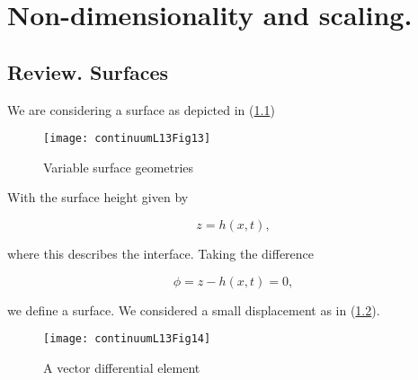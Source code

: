 %
%

\chapter{Non-dimensionality and scaling.}
\label{chap:continuumL14}
{}
\date{Mar 7, 2012}

\beginArtWithToc

%

\section{Review.  Surfaces}

We are considering a surface as depicted in (\ref{fig:continuumL14:continuumL14Fig13})

\begin{figure}[htp]
   \centering
   \texttt{[image: continuumL13Fig13]}
   \caption{Variable surface geometries}\label{fig:continuumL14:continuumL14Fig13}
\end{figure}

With the surface height given by

\begin{equation}\label{eqn:continuumL14:10}
z = h(x, t),
\end{equation}

where this describes the interface.  Taking the difference

\begin{equation}\label{eqn:continuumL14:30}
\phi = z - h(x, t) = 0,
\end{equation}

we define a surface.  We considered a small displacement as in (\ref{fig:continuumL14:continuumL14Fig14}).

\begin{figure}[htp]
   \centering
   \texttt{[image: continuumL13Fig14]}
   \caption{A vector differential element}\label{fig:continuumL14:continuumL14Fig14}
\end{figure}

